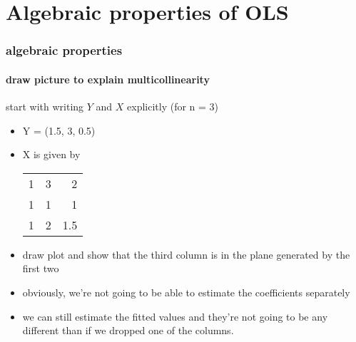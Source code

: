 

\part*{Algebraic properties of OLS}%

\section{algebraic properties}
\subsection{draw picture to explain multicollinearity}

start with writing $Y$ and $X$ explicitly (for n = 3)
\begin{itemize}
\item Y = (1.5, 3, 0.5)
\item X is given by

  \begin{center}
    \begin{tabular}{rrr}
      1  &  3  &    2  \\
      1  &  1  &    1  \\
      1  &  2  &  1.5  \\
    \end{tabular}
  \end{center}

\item draw plot and show that the third column is in the plane
  generated by the first two
\item obviously, we're not going to be able to estimate the
  coefficients separately
\item we can still estimate the fitted values and they're not going to
  be any different than if we dropped one of the columns.
\end{itemize}

